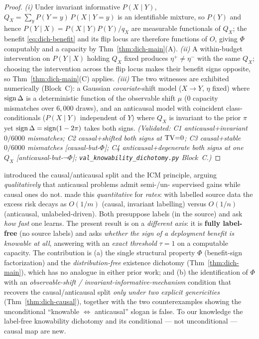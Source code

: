 \begin{proof}
\emph{(i)} Under invariant informative $P(X\mid Y)$, $Q_X=\sum_y P(Y{=}y)\,P(X\mid Y{=}y)$
is an identifiable mixture, so $P(Y)$ and hence $P(Y\mid X)=P(X\mid Y)P(Y)/q_X$ are
measurable functionals of $Q_X$; the benefit \eqref{eq:dich-benefit} and its flip locus
are therefore functions of $O$, giving $\Phi$ computably and a capacity by
Thm~\ref{thm:dich-main}(A). \emph{(ii)} A within-budget intervention on $P(Y\mid X)$
holding $Q_X$ fixed produces $\eta^+\neq\eta^-$ with the same $Q_X$; choosing the
intervention across the flip locus makes their benefit signs opposite, so
Thm~\ref{thm:dich-main}(C) applies. \emph{(iii)} The two witnesses are exhibited
numerically (Block~C): a Gaussian \emph{covariate}-shift model ($X\to Y$, $\eta$ fixed)
where $\operatorname{sign}\Delta$ is a deterministic function of the observable shift $\mu$
($0$ capacity mismatches over $6{,}000$ draws), and an anticausal model with coincident
class-conditionals ($P(X\mid Y)$ independent of $Y$) where $Q_X$ is invariant to the
prior $\pi$ yet $\operatorname{sign}\Delta=\operatorname{sign}(1-2\pi)$ takes both signs.
\emph{(Validated: C1 anticausal+invariant $0/6000$ mismatches; C2 causal+shifted both
signs at $\mathrm{TV}{=}0$; C3 causal+stable $0/6000$ mismatches [causal-but-$\Phi$]; C4
anticausal+degenerate both signs at one $Q_X$ [anticausal-but-$\neg\Phi$];
\texttt{val\_knowability\_dichotomy.py} Block~C.)}
\end{proof}

\begin{remark}
\label{rmk:dich-novelty}
\citet{scholkopf2012causal} introduced the causal/anticausal split and the ICM
principle, arguing \emph{qualitatively} that anticausal problems admit semi-/un-
supervised gains while causal ones do not. \citet{wu2024causality} made this
\emph{quantitative} for \emph{rates}: with labelled source data the excess risk decays
as $O(1/m)$ (causal, invariant labelling) versus $O(1/n)$ (anticausal, unlabeled-driven).
Both presuppose labels (in the source) and ask \emph{how fast} one learns. The present
result is on a \emph{different axis}: it is \textbf{fully label-free} (no source labels)
and asks \emph{whether the sign of a deployment benefit is knowable at all}, answering
with an \emph{exact threshold} $\tau=1$ on a computable capacity. The contribution is
(a) the single structural property $\Phi$ (benefit-sign factorization) and the
\emph{distribution-free} existence dichotomy (Thm~\ref{thm:dich-main}), which has no
analogue in either prior work; and (b) the identification of $\Phi$ with an
\emph{observable-shift / invariant-informative-mechanism} condition that recovers the
causal/anticausal split \emph{only under two explicit genericities}
(Thm~\ref{thm:dich-causal}), together with the two counterexamples showing the
unconditional ``knowable $\iff$ anticausal'' slogan is false. To our knowledge the
label-free knowability dichotomy and its conditional --- not unconditional --- causal
map are new.
\end{remark}

